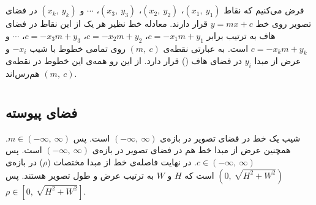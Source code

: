 \documentclass{article}
\begin{document}


\newpage


\section{}%
فرض می‌کنیم که نقاط 
$(x_{1},\: y_{1})$، 
$(x_{2},\: y_{2})$، 
$(x_{3},\: y_{3})$، 
$\cdots $ و 
$(x_{k},\: y_{k})$ در فضای تصویر روی خط 
$y=mx+c$
قرار دارند. معادله خط نظیر هر یک از این نقاط در فضای هاف به ترتیب برابر 
$c = -x_{1}m + y_{1}$، 
$c = -x_{2}m + y_{2}$، 
$c = -x_{3}m + y_{3}$، 
$\cdots $ و 
$c = -x_{k}m + y_{k}$ 
است. به عبارتی نقطه‌ی $(m,\:c)$ روی تمامی خطوط با شیب $-x_{i}$ و عرض از مبدا $y_{i}$ در فضای هاف () قرار دارد. از این رو همه‌ی این خطوط در نقطه‌ی $(m,\:c)$ هم‌رس‌اند.


\section{}%
\subsection{فضای پیوسته}
شیب یک خط در فضای تصویر در بازه‌ی $\left( -\infty ,\: \infty \right)$ است. پس 
$
m \in \left( -\infty ,\: \infty \right)
$.
همچنین عرض از مبدا خط هم در فضای تصویر در بازه‌ی $\left( -\infty ,\: \infty \right)$ است. پس 
$
c \in \left( -\infty ,\: \infty \right)
$.
در نهایت فاصله‌ی خط از مبدا مختصات ($\rho$) در بازه‌ی $\left( 0 ,\: \sqrt{H^2 + W^2} \right)$ است که $H$ و $W$ به ترتیب عرض و طول تصویر هستند. پس 
$
\rho \in \left[ 0 ,\: \sqrt{H^2 + W^2} \right]
$.
\end{document}
